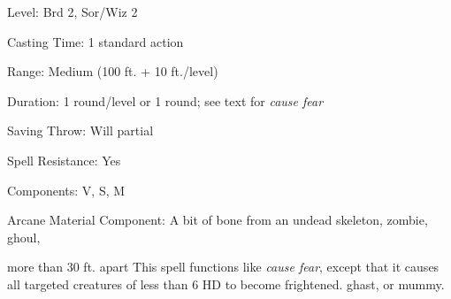 
\begin{description*}
\item[Level:] Brd 2, Sor/Wiz 2
\item[Casting Time:] 1 standard action
\item[Range:] Medium (100 ft. + 10 ft./level)
\item[Duration:] 1 round/level or 1 round; see text for \textit{cause fear}
\item[Saving Throw:] Will partial
\item[Spell Resistance:] Yes
\item[Components:] V, S, M
\item[Arcane Material Component:] A bit of bone from an undead skeleton, zombie, ghoul,
\end{description*}

more than 30 ft. apart
This spell functions like \textit{cause fear}, except that it causes all targeted
creatures of less than 6 HD to become frightened.
ghast, or mummy.